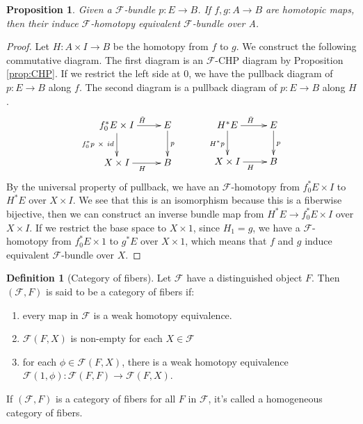 \documentclass[psamsfonts]{amsart}
\newtheorem{prop}[thm]{Proposition}
\theoremstyle{definition}
\newtheorem{defn}[thm]{Definition}
\theoremstyle{remark}
\numberwithin{equation}{section}
\begin{document}
\begin{prop} 
\label{prop:homotopicMapInduceBundle}
Given a $\mathcal{F}$-bundle $p: E \to B$. If $f, g: A \rightarrow B$ are homotopic maps, then their induce $\mathcal{F}$-homotopy equivalent $\mathcal{F}$-bundle over A.
\end{prop}
\begin{proof}
Let $H: A\times I \to B$ be the homotopy from $f$ to $g$. We construct the following commutative diagram. The first diagram is an $\mathcal{F}$-CHP diagram by Proposition \ref{prop:CHP}. If we restrict the left side at $0$, we have the pullback diagram of $p: E \to B$ along $f$. The second diagram is a pullback diagram of $p: E \to B$ along $H$. 
\[\xymatrix{
f_{0}^{*}E \times I \ar[r]^{\tilde{H}} \ar[d]_{f_{0}^{*}p\ \times\ id} & E \ar[d] ^{p}\\
X \times I \ar[r]_{H} & B\\} \hspace{30pt}
\xymatrix{
H^{*}E \ar[r]^{\tilde{H}} \ar[d]_{H^{*}p} & E \ar[d] ^{p}\\
X \times I \ar[r]_{H} & B\\}\]
By the universal property of pullback, we have an $\mathcal{F}$-homotopy from $f_{0}^{*}E \times I$ to $H^{*}E$ over $X \times I$. We see that this is an isomorphism because this is a fiberwise bijective, then we can construct an inverse bundle map from $H^{*}E \to f_{0}^{*}E \times I$ over $X \times I$. If we restrict the base space to $X \times {1}$, since $H_{1} = g$, we have a $\mathcal{F}$-homotopy from $f_{0}^{*}E \times {1}$ to $g^{*}E$ over $X \times {1}$, which means that $f$ and $g$ induce equivalent $\mathcal{F}$-bundle over $X$.
\end{proof}

\begin{defn}[Category of fibers]
\label{def: catFiber}
Let $\mathcal{F}$ have a distinguished object $F$. Then $(\mathcal{F}, F)$ is said to be a category of fibers if:  
\begin{enumerate}
    \item every map in $\mathcal{F}$ is a weak homotopy equivalence.
    \item $\mathcal{F}(F, X)$ is non-empty for each $X \in \mathcal{F}$
    \item for each $\phi \in \mathcal{F}(F, X)$, there is a weak homotopy equivalence $\mathcal{F}(1, \phi): \mathcal{F}(F, F) \rightarrow \mathcal{F}(F, X)$. 
\end{enumerate}
If $(\mathcal{F}, F)$ is a category of fibers for all $F$ in $\mathcal{F}$, it's called a homogeneous category of fibers.
\end{defn}
\end{document}
